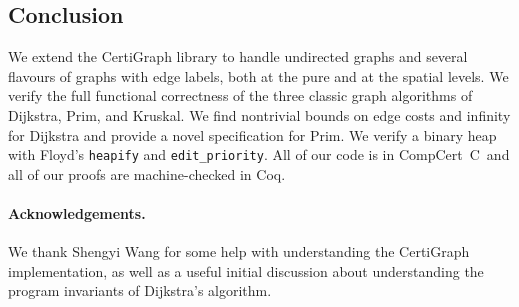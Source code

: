 \vspace*{-0.25em}
\subsection{Conclusion}
\vspace*{-0.25em}

We extend the CertiGraph library to handle undirected graphs and several flavours of graphs with edge labels, both at the pure and at the spatial levels.  We verify the full functional correctness of the three classic graph algorithms of Dijkstra, Prim, and Kruskal.  We find nontrivial bounds on edge costs and infinity for Dijkstra and provide a novel specification for Prim.  We verify a binary heap with Floyd's \texttt{heapify} and \texttt{edit\_priority}.  
All of our code is in CompCert~C~and all of our proofs are machine-checked in Coq.

\paragraph{Acknowledgements.}  We thank Shengyi Wang for some help with understanding the CertiGraph implementation, as well as a useful initial discussion about understanding the program invariants of Dijkstra's algorithm.











